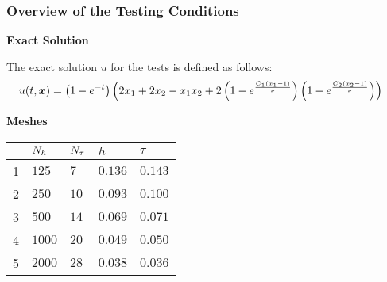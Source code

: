 \begin{frame}
    \frametitle{Overview of the Testing Conditions}

    \vspace*{\fill}
    \begin{center}
        {\color{\accentcolor} \Large \textbf{Exact Solution}}
        \vspace*{0.25cm}

        \begin{minipage}{0.75\textwidth}
            \begin{definition}
                The exact solution $u$ for the tests is defined as follows:
                \begin{align*}
                    u(t, \bm{x}) &= \left( 1 - e^{-t} \right) \left( 2 x_1 + 2 x_2 - x_1 x_2 + 2 \left( 1 - e^{\frac{C_1 \left( x_1 - 1 \right) }{\nu}} \right) \left( 1 - e^{\frac{C_2 \left( x_2 - 1 \right) }{\nu}} \right) \right)
                \end{align*}
            \end{definition}
        \end{minipage}
    \end{center}

    \vspace*{\fill}

    \begin{center}
        {\color{\accentcolor} \Large \textbf{Meshes}}
        \vspace*{0.25cm}

        \begin{minipage}{0.75\textwidth}
            \begin{table}[!ht]
                \def\arraystretch{1.25}
                \begin{tabular}{ | C{0.75cm} || C{1.75cm} | C{1.75cm} | C{1.75cm} | C{1.75cm} | }
                    \hline
                     & $N_h$ & $N_{\tau}$ & $h$ & $\tau$ \\
                    \hline
                     & $125$ & $7$ & $\num{0.136}$ & $\num{0.143}$ \\
                    2 & $250$ & $10$ & $\num{0.093}$ & $\num{0.100}$ \\
                    3 & $500$ & $14$ & $\num{0.069}$ & $\num{0.071}$ \\
                    4 & $1000$ & $20$ & $\num{0.049}$ & $\num{0.050}$ \\
                    5 & $2000$ & $28$ & $\num{0.038}$ & $\num{0.036}$ \\
                    \hline
                \end{tabular}
            \end{table}
        \end{minipage}
    \end{center}
    \vspace*{\fill}
    
\end{frame}

